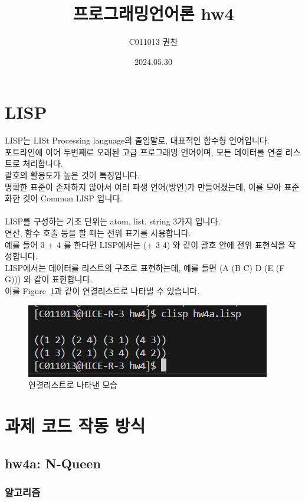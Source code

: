 \documentclass{article}
\title{프로그래밍언어론 hw4}
\author{C011013 권찬}
\date{2024.05.30}
\begin{document}
\maketitle

\section{LISP}
\quad LISP는 LISt Processing language의 줄임말로, 대표적인 함수형 언어입니다.\\
포트라인에 이어 두번째로 오래된 고급 프로그래밍 언어이며, 모든 데이터를 연결 리스트로 처리합니다.\\
괄호의 활용도가 높은 것이 특징입니다.\\
명확한 표준이 존재하지 않아서 여러 파생 언어(방언)가 만들어졌는데, 이를 모아 표준화한 것이 Common LISP 입니다.\\\\
LISP를 구성하는 기초 단위는 atom, list, string 3가지 입니다.\\
연산, 함수 호출 등을 할 때는 전위 표기를 사용합니다.\\
예를 들어 3 + 4 를 한다면 LISP에서는 (+ 3 4) 와 같이 괄호 안에 전위 표현식을 작성합니다.\\
LISP에서는 데이터를 리스트의 구조로 표현하는데, 예를 들면 (A (B C) D (E (F G))) 와 같이 표현합니다.\\
이를 Figure~\ref{fig-1}과 같이 연결리스트로 나타낼 수 있습니다.

\begin{figure}[!htb]
    \centering
    \includegraphics[width=0.5\linewidth]{hw4_img1.png}
    \caption{연결리스트로 나타낸 모습}
    \label{fig-1}
\end{figure}

\section{과제 코드 작동 방식}
\subsection{hw4a: N-Queen}
\subsubsection{알고리즘}
\end{document}
